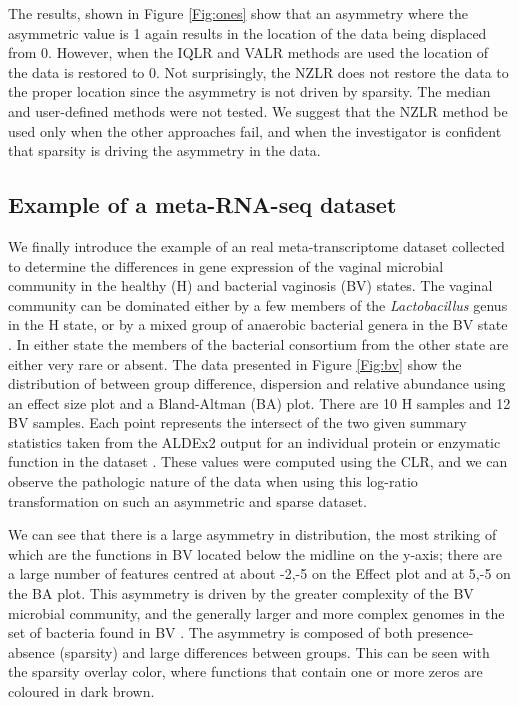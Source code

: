 \documentclass{bmcart}
\begin{document}
The results, shown in Figure \ref{Fig:ones} show that an asymmetry where the asymmetric value is 1 again results in the location of the data being displaced from 0. However, when the IQLR and VALR methods are used the location of the data is restored to 0. Not surprisingly, the NZLR does not restore the data to the proper location since the asymmetry is not driven by sparsity. The median and user-defined methods were not tested. We suggest that the NZLR method be used only when the other approaches fail, and when the investigator is confident that sparsity is driving the asymmetry in the data. 


\subsection*{Example of a meta-RNA-seq dataset}
 We finally introduce the example of an real meta-transcriptome dataset collected to determine the differences in gene expression of the vaginal microbial community in the healthy (H) and bacterial vaginosis (BV) states. The vaginal community can be dominated either by a few members of the \textit{Lactobacillus} genus in the H state, or by a mixed group of anaerobic bacterial genera in the BV state \cite{Ravel:2010}. In either state the members of the bacterial consortium from the other state are either very rare or absent. The data presented in Figure \ref{Fig:bv} show the distribution of between group difference, dispersion and relative abundance using an effect size plot  and a Bland-Altman (BA) plot. There are 10 H samples and 12 BV samples. Each point represents the intersect of the two given summary statistics taken from the ALDEx2 output for an individual protein or enzymatic function in the dataset \cite{macklaim:2013}. These values were computed using the CLR, and we can observe the pathologic nature of the data when using this log-ratio transformation on such an asymmetric and sparse dataset. 

We can see that there is a large asymmetry in distribution, the most striking of which are the functions in BV located below the midline on the y-axis; there are a large number of features centred at about -2,-5 on the Effect plot and at 5,-5 on the BA plot. This asymmetry is driven by the greater complexity of the BV microbial community, and the generally larger and more complex genomes in the set of bacteria found in BV \cite{macklaim:2013}. The asymmetry is composed of both presence-absence (sparsity) and large differences between groups. This can be seen with the sparsity overlay color, where functions that contain one or more zeros are coloured in dark brown. 
\end{document}
